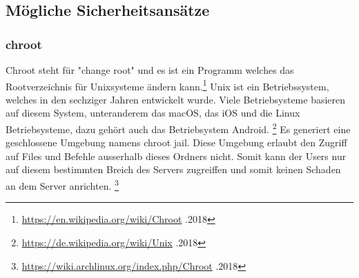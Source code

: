 \documentclass[10pt]{article}
\begin{document}
	\subsection{Mögliche Sicherheitsansätze}
	\subsubsection{chroot}
	
	Chroot steht für "change root" und es ist ein Programm welches das Rootverzeichnis für Unixsysteme ändern kann.\footnote{\label{foot:1} \href{https://en.wikipedia.org/wiki/Chroot}{https://en.wikipedia.org/wiki/Chroot} .2018} Unix ist ein Betriebssystem, welches in den sechziger Jahren entwickelt wurde. Viele Betriebsysteme basieren auf diesem System, unteranderem das macOS, das iOS und die Linux Betriebsysteme, dazu gehört auch das Betriebsystem Android. \footnote{\label{foot:2} \href{https://de.wikipedia.org/wiki/Unix}{https://de.wikipedia.org/wiki/Unix} .2018}  Es generiert eine geschlossene Umgebung namens chroot jail. Diese Umgebung erlaubt den Zugriff auf  Files und Befehle ausserhalb dieses Ordners nicht. Somit kann der Users nur auf diesem bestimmten Breich des Servers zugreiffen und somit keinen Schaden an dem Server anrichten. \footnote{\label{foot:3} \href{https://wiki.archlinux.org/index.php/Chroot}{https://wiki.archlinux.org/index.php/Chroot} .2018}
		

	
	
\end{document}
